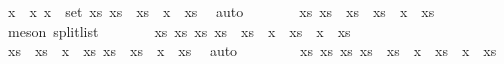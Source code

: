 \begin{isabellebody}
\ {\isacartoucheopen}x\ {\isacharless}{\kern0pt}\ x\ {\isacartoucheopen}x\ {\isasymin}\ set\ xs{\isacartoucheclose}\ {\isacartoucheopen}xs\ {\isacharequal}{\kern0pt}\ xs\ {\isacharat}{\kern0pt}\ x\ {\isacharhash}{\kern0pt}\ xs\ \isamarkupfalse%
\ auto\isanewline
\ \ \ \ \isamarkupfalse%
\ \isamarkupfalse%
\ xs\ xs\ \ {\isachardoublequoteopen}xs\ {\isacharequal}{\kern0pt}\ xs\ {\isacharat}{\kern0pt}\ x\ {\isacharhash}{\kern0pt}\ xs\isanewline
\ \ \ \ \ \ \isamarkupfalse%
\ {\isacharparenleft}{\kern0pt}meson\ split{\isacharunderscore}{\kern0pt}list{\isacharparenright}{\kern0pt}\isanewline
\ \ \ \ \isamarkupfalse%
\ \isamarkupfalse%
\ {\isachardoublequoteopen}{\isasymexists}xs\ xs\ xs\ xs\ {\isacharequal}{\kern0pt}\ xs\ {\isacharat}{\kern0pt}\ x\ {\isacharhash}{\kern0pt}\ xs\ {\isacharat}{\kern0pt}\ x\ {\isacharhash}{\kern0pt}\ xs\isanewline
\ \ \ \ \ \ \isamarkupfalse%
\ {\isacartoucheopen}xs\ {\isacharequal}{\kern0pt}\ xs\ {\isacharat}{\kern0pt}\ x\ {\isacharhash}{\kern0pt}\ xs\ {\isacartoucheopen}xs\ {\isacharequal}{\kern0pt}\ xs\ {\isacharat}{\kern0pt}\ x\ {\isacharhash}{\kern0pt}\ xs\ \isamarkupfalse%
\ auto\isanewline
\ \ \isamarkupfalse%
\isanewline
\ \ \ \ \isamarkupfalse%
\ {\isachardoublequoteopen}{\isasymexists}xs\ xs\ xs\ xs\ {\isacharequal}{\kern0pt}\ xs\ {\isacharat}{\kern0pt}\ x\ {\isacharhash}{\kern0pt}\ xs\ {\isacharat}{\kern0pt}\ x\ {\isacharhash}{\kern0pt}\ xs\isanewline

\end{isabellebody}
